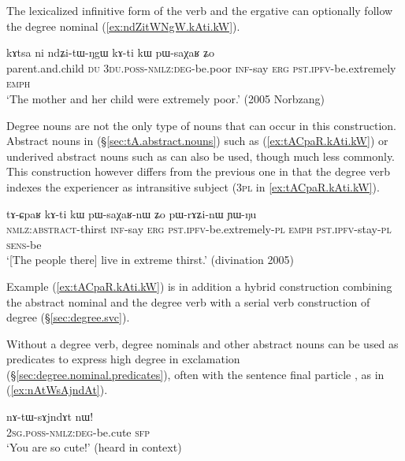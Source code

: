 The lexicalized infinitive form  of the verb  and the ergative can optionally follow the degree nominal (\ref{ex:ndZitWNgW.kAti.kW}).

\begin{exe}
\ex \label{ex:ndZitWNgW.kAti.kW}
\gll kɤtsa ni ndʑi-tɯ-ŋgɯ kɤ-ti kɯ pɯ-saχaʁ ʑo \\
parent.and.child \textsc{du} \textsc{3du}.\textsc{poss}-\textsc{nmlz}:\textsc{deg}-be.poor \textsc{inf}-say \textsc{erg} \textsc{pst}.\textsc{ipfv}-be.extremely \textsc{emph} \\
\glt `The mother and her child were extremely poor.' (2005 Norbzang)
\end{exe}

Degree nouns are not the only type of nouns that can occur in this construction. Abstract nouns in  (§\ref{sec:tA.abstract.nouns}) such as  (\ref{ex:tACpaR.kAti.kW}) or underived abstract nouns such as  can also be used, though much less commonly.  This construction however differs from the previous one in that the degree verb  indexes the experiencer as intransitive subject (\textsc{3pl} in \ref{ex:tACpaR.kAti.kW}).
  
\begin{exe}
\ex \label{ex:tACpaR.kAti.kW}
\gll  tɤ-ɕpaʁ kɤ-ti kɯ pɯ-saχaʁ-nɯ ʑo pɯ-rɤʑi-nɯ ɲɯ-ŋu  \\
\textsc{nmlz}:\textsc{abstract}-thirst \textsc{inf}-say \textsc{erg} \textsc{pst}.\textsc{ipfv}-be.extremely-\textsc{pl} \textsc{emph} \textsc{pst}.\textsc{ipfv}-stay-\textsc{pl} \textsc{sens}-be \\
\glt `[The people there] live in extreme thirst.' (divination 2005)
\end{exe}

Example (\ref{ex:tACpaR.kAti.kW}) is in addition a hybrid construction combining the abstract nominal and the degree verb with a serial verb construction of degree (§\ref{sec:degree.svc}).

Without a degree verb, degree nominals and other abstract nouns can be used as predicates to express high degree in exclamation (§\ref{sec:degree.nominal.predicates}), often with the sentence final particle , as in (\ref{ex:nAtWsAjndAt}).

\begin{exe}
\ex \label{ex:nAtWsAjndAt}
\gll nɤ-tɯ-sɤjndɤt nɯ! \\
\textsc{2sg}.\textsc{poss}-\textsc{nmlz}:\textsc{deg}-be.cute \textsc{sfp} \\
\glt `You are so cute!' (heard in context)
\end{exe}



